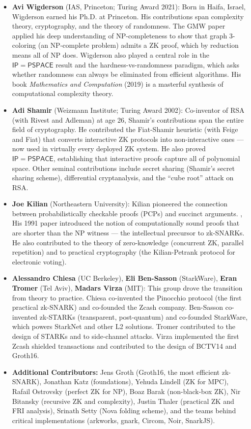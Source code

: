 \begin{itemize}
\item \textbf{Avi Wigderson} (IAS, Princeton; Turing Award 2021): Born in Haifa, Israel, Wigderson earned his Ph.D. at Princeton. His contributions span complexity theory, cryptography, and the theory of randomness. The GMW paper applied his deep understanding of NP-completeness to show that graph 3-coloring (an NP-complete problem) admits a ZK proof, which by reduction means all of NP does. Wigderson also played a central role in the $\mathsf{IP} = \mathsf{PSPACE}$ result and the hardness-vs-randomness paradigm, which asks whether randomness can always be eliminated from efficient algorithms. His book \emph{Mathematics and Computation} (2019) is a masterful synthesis of computational complexity theory.

\item \textbf{Adi Shamir} (Weizmann Institute; Turing Award 2002): Co-inventor of RSA (with Rivest and Adleman) at age 26, Shamir's contributions span the entire field of cryptography. He contributed the Fiat-Shamir heuristic (with Feige and Fiat) that converts interactive ZK protocols into non-interactive ones --- now used in virtually every deployed ZK system. He also proved $\mathsf{IP} = \mathsf{PSPACE}$, establishing that interactive proofs capture all of polynomial space. Other seminal contributions include secret sharing (Shamir's secret sharing scheme), differential cryptanalysis, and the ``cube root'' attack on RSA.

\item \textbf{Joe Kilian} (Northeastern University): Kilian pioneered the connection between probabilistically checkable proofs (PCPs) and succinct arguments. \cite{goldreichmicaliwigderson1991}, His 1991 paper introduced the notion of computationally sound proofs that are shorter than the NP witness --- the intellectual precursor to zk-SNARKs. He also contributed to the theory of zero-knowledge (concurrent ZK, parallel repetition) and to practical cryptography (the Kilian-Petrank protocol for electronic voting).

\item \textbf{Alessandro Chiesa} (UC Berkeley), \textbf{Eli Ben-Sasson} (StarkWare), \textbf{Eran Tromer} (Tel Aviv), \textbf{Madars Virza} (MIT): This group drove the transition from theory to practice. Chiesa co-invented the Pinocchio protocol (the first practical zk-SNARK) and co-founded the Zcash company. Ben-Sasson co-invented zk-STARKs (transparent, post-quantum) and co-founded StarkWare, which powers StarkNet and other L2 solutions. Tromer contributed to the design of STARKs and to side-channel attacks. Virza implemented the first Zcash shielded transactions and contributed to the design of BCTV14 and Groth16.

\item \textbf{Additional Contributors:} Jens Groth (Groth16, the most efficient zk-SNARK), Jonathan Katz (foundations), Yehuda Lindell (ZK for MPC), Rafail Ostrovsky (perfect ZK for NP), Boaz Barak (non-black-box ZK), Nir Bitansky (recursive ZK and complexity), Justin Thaler (practical ZK and FRI analysis), Srinath Setty (Nova folding scheme), and the teams behind critical implementations (arkworks, gnark, Circom, Noir, SnarkJS).
\end{itemize}

